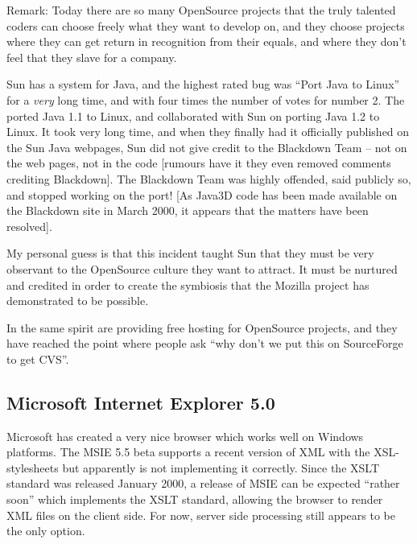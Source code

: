 Remark: Today there are so many OpenSource projects that the truly
talented coders can choose freely what they want to develop on, and
they choose projects where they can get return in recognition from
their equals, and where they don't feel that they slave for a company.

Sun has a
 system for Java, and the highest rated
bug was ``Port Java to Linux'' for a \textit{very} long time, and with
four times the number of votes for number 2.  The
 ported Java 1.1 to
Linux, and collaborated with Sun on porting Java 1.2 to Linux.  It
took very long time, and when they finally had it officially published
on the Sun Java webpages, Sun did not give credit to the Blackdown
Team -- not on the web pages, not in the code [rumours have it they
even removed comments crediting Blackdown].  The Blackdown Team was
highly offended, said publicly so, and stopped working on the port!
[As Java3D code has been made available on the Blackdown site in
March 2000, it appears that the matters have been resolved].

My personal guess is that this incident taught Sun that they must be
very observant to the OpenSource culture they want to attract.  It
must be nurtured and credited in order to create the symbiosis that
the Mozilla project has demonstrated to be possible.

In the same spirit 
are providing free hosting for OpenSource projects, and they have
reached the point where people ask ``why don't we put this on
SourceForge to get CVS''.

\subsection{Microsoft Internet Explorer 5.0}
\label{sec:microsoft-internet-explorer}

Microsoft has created a very nice browser which works well on Windows
platforms.  The MSIE 5.5 beta supports a recent version of XML with
the XSL-stylesheets but apparently is not implementing it correctly.
Since the XSLT standard was released January 2000, a release of MSIE
can be expected ``rather soon'' which implements the XSLT standard,
allowing the browser to render XML files on the client side.  For now,
server side processing still appears to be the only option.

